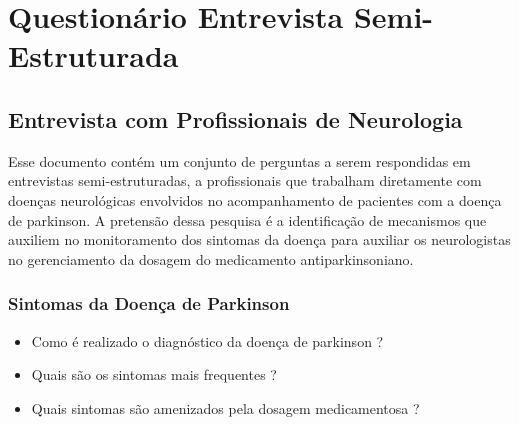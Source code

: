 \chapter{Questionário Entrevista Semi-Estruturada} \label{apendice:entrevista-semi-estruturada}

\section{Entrevista com Profissionais de Neurologia}

Esse documento contém um conjunto de perguntas a serem respondidas em entrevistas semi-estruturadas, a profissionais que trabalham diretamente com doenças neurológicas envolvidos no acompanhamento de pacientes com a doença de parkinson. A pretensão dessa pesquisa é a identificação de mecanismos que auxiliem no monitoramento dos sintomas da doença para auxiliar os neurologistas no gerenciamento da dosagem do medicamento antiparkinsoniano.

\subsection{Sintomas da Doença de Parkinson}
\begin{itemize}
    \item Como é realizado o diagnóstico da doença de parkinson ?
		\item Quais são os sintomas mais frequentes ?
		\item Quais sintomas são amenizados pela dosagem medicamentosa ?
\end{itemize}

